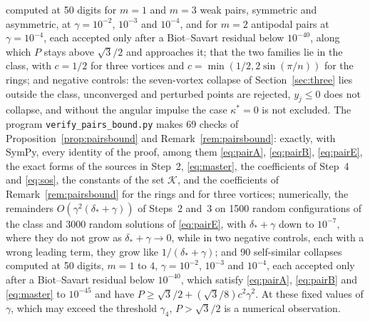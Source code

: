 \documentclass[11pt]{article}
\theoremstyle{definition}
\begin{document}
computed at 50 digits for $m = 1$ and $m = 3$ weak pairs, symmetric and asymmetric, at $\gamma = 10^{-2}$, $10^{-3}$ and $10^{-4}$, and for $m = 2$ antipodal pairs at $\gamma = 10^{-4}$, each accepted only after a Biot--Savart residual below $10^{-40}$, along which $P$ stays above $\sqrt{3}/2$ and approaches it; that the two families lie in the class, with $c = 1/2$ for three vortices and $c = \min(1/2, 2\sin(\pi/n))$ for the rings; and negative controls: the seven-vortex collapse of Section~\ref{sec:three} lies outside the class, unconverged and perturbed points are rejected, $y_j \le 0$ does not collapse, and without the angular impulse the case $\kappa^* = 0$ is not excluded. The program \texttt{verify\_\allowbreak pairs\_\allowbreak bound.py} makes 69 checks of Proposition~\ref{prop:pairsbound} and Remark~\ref{rem:pairsbound}: exactly, with SymPy, every identity of the proof, among them \eqref{eq:pairA}, \eqref{eq:pairB}, \eqref{eq:pairE}, the exact forms of the sources in Step~2, \eqref{eq:master}, the coefficients of Step~4 and \eqref{eq:sos}, the constants of the set $\mathcal{K}$, and the coefficients of Remark~\ref{rem:pairsbound} for the rings and for three vortices; numerically, the remainders $O(\gamma^2(\delta_* + \gamma))$ of Steps~2 and~3 on 1500 random configurations of the class and 3000 random solutions of \eqref{eq:pairE}, with $\delta_* + \gamma$ down to $10^{-7}$, where they do not grow as $\delta_* + \gamma \to 0$, while in two negative controls, each with a wrong leading term, they grow like $1/(\delta_* + \gamma)$; and 90 self-similar collapses computed at 50 digits, $m = 1$ to $4$, $\gamma = 10^{-2}$, $10^{-3}$ and $10^{-4}$, each accepted only after a Biot--Savart residual below $10^{-40}$, which satisfy \eqref{eq:pairA}, \eqref{eq:pairB} and \eqref{eq:master} to $10^{-45}$ and have $P \ge \sqrt{3}/2 + (\sqrt{3}/8)c^2\gamma^2$. At these fixed values of $\gamma$, which may exceed the threshold $\gamma_4$, $P > \sqrt{3}/2$ is a numerical observation.
\end{document}
